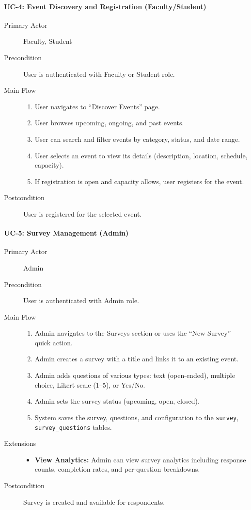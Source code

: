 \documentclass[11pt,a4paper]{article}
\begin{document}
\paragraph{UC-4: Event Discovery and Registration (Faculty/Student)}
\begin{description}
  \item[Primary Actor] Faculty, Student
  \item[Precondition] User is authenticated with Faculty or Student role.
  \item[Main Flow]
    \begin{enumerate}[leftmargin=1.5em]
      \item User navigates to ``Discover Events'' page.
      \item User browses upcoming, ongoing, and past events.
      \item User can search and filter events by category, status, and date range.
      \item User selects an event to view its details (description, location, schedule, capacity).
      \item If registration is open and capacity allows, user registers for the event.
    \end{enumerate}
  \item[Postcondition] User is registered for the selected event.
\end{description}

\paragraph{UC-5: Survey Management (Admin)}
\begin{description}
  \item[Primary Actor] Admin
  \item[Precondition] User is authenticated with Admin role.
  \item[Main Flow]
    \begin{enumerate}[leftmargin=1.5em]
      \item Admin navigates to the Surveys section or uses the ``New Survey'' quick action.
      \item Admin creates a survey with a title and links it to an existing event.
      \item Admin adds questions of various types: text (open-ended), multiple choice, Likert scale (1--5), or Yes/No.
      \item Admin sets the survey status (upcoming, open, closed).
      \item System saves the survey, questions, and configuration to the \texttt{survey}, \texttt{survey\_questions} tables.
    \end{enumerate}
  \item[Extensions]
    \begin{itemize}[leftmargin=1.5em]
      \item \textbf{View Analytics:} Admin can view survey analytics including response counts, completion rates, and per-question breakdowns.
    \end{itemize}
  \item[Postcondition] Survey is created and available for respondents.
\end{description}
\end{document}
